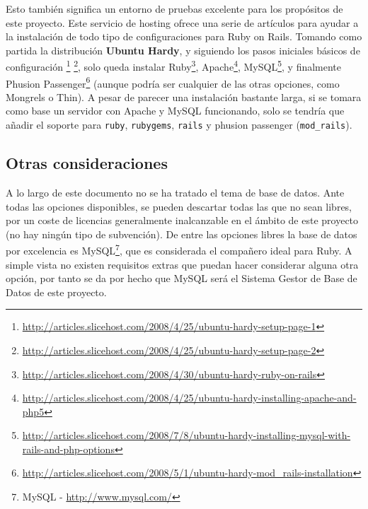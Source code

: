 Esto también significa un entorno de pruebas excelente para los propósitos de este proyecto. Este servicio de hosting ofrece una serie de artículos para ayudar a la instalación de todo tipo de configuraciones para Ruby on Rails. Tomando como partida la distribución \textbf{Ubuntu Hardy}, y siguiendo los pasos iniciales básicos de configuración \footnote{\url{http://articles.slicehost.com/2008/4/25/ubuntu-hardy-setup-page-1}} \footnote{\url{http://articles.slicehost.com/2008/4/25/ubuntu-hardy-setup-page-2}}, solo queda instalar Ruby\footnote{\url{http://articles.slicehost.com/2008/4/30/ubuntu-hardy-ruby-on-rails}}, Apache\footnote{\url{http://articles.slicehost.com/2008/4/25/ubuntu-hardy-installing-apache-and-php5}}, MySQL\footnote{\url{http://articles.slicehost.com/2008/7/8/ubuntu-hardy-installing-mysql-with-rails-and-php-options}}, y finalmente Phusion Passenger\footnote{\url{http://articles.slicehost.com/2008/5/1/ubuntu-hardy-mod_rails-installation}} (aunque podría ser cualquier de las otras opciones, como Mongrels o Thin). A pesar de parecer una instalación bastante larga, si se tomara como base un servidor con Apache y MySQL funcionando, solo se tendría que añadir el soporte para \texttt{ruby}, \texttt{rubygems}, \texttt{rails} y phusion passenger (\texttt{mod\_rails}).

\subsection{Otras consideraciones}
A lo largo de este documento no se ha tratado el tema de base de datos. Ante todas las opciones disponibles, se pueden descartar todas las que no sean libres, por un coste de licencias generalmente inalcanzable en el ámbito de este proyecto (no hay ningún tipo de subvención). De entre las opciones libres la base de datos por excelencia es MySQL\footnote{MySQL - \url{http://www.mysql.com/}}, que es considerada el compañero ideal para Ruby. A simple vista no existen requisitos extras que puedan hacer considerar alguna otra opción, por tanto se da por hecho que MySQL será el Sistema Gestor de Base de Datos de este proyecto.
